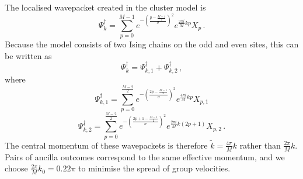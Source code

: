 The localised wavepacket created in the cluster model is
\begin{equation}
    \Psi_k^{\dagger} = \sum_{p=0}^{M-1} e^{-\left(\frac{p-\frac{M-1}{2}}{\sigma}\right)^2}e^{\frac{2\pi i}{M}k p} X_p \,.
\end{equation}
Because the model consists of two Ising chains on the odd and even sites, this can be written as
\begin{equation}
    \Psi_k^{\dagger} = \Psi_{k,1}^{\dagger} +\Psi_{k,2}^{\dagger}\,,
\end{equation}
where
\begin{equation}
        \Psi_{k,1}^{\dagger} = \sum_{p=0}^{\frac{M-2}{2}} e^{-\left(\frac{2p-\frac{M-1}{2}}{\sigma}\right)^2}e^{\frac{4\pi i}{M}k p} X_{p,1} 
\end{equation}
\begin{equation}
        \Psi_{k,2}^{\dagger} = \sum_{p=0}^{\frac{M-2}{2}} e^{-\left(\frac{2p+1-\frac{M-1}{2}}{\sigma}\right)^2}e^{\frac{2\pi i}{M}k (2p+1)} X_{p,2} \,.
\end{equation}
The central momentum of these wavepackets is therefore $\tilde k =\frac{4\pi}{M}k$ rather than $\frac{2\pi}{M}k$. Pairs of ancilla outcomes correspond to the same effective momentum, and we choose $\frac{2\pi }{M}k_0=0.22\pi$ to minimise the spread of group velocities.

